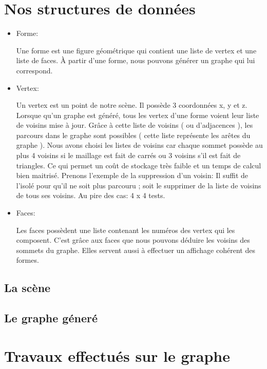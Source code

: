 \documentclass[a4paper,12pt]{report}
\begin{document}
\section{Nos structures de données}
\begin{itemize}
 \item Forme:

Une forme est une figure géométrique qui contient une liste de vertex
et une liste de faces.
À partir d'une forme, nous pouvons générer un graphe qui lui correspond.
 
 \item Vertex:

Un vertex est un point de notre scène.
Il possède 3 coordonnées x, y et z.
Lorsque qu'un graphe est généré, tous les vertex d'une forme voient leur
liste de voisins mise à jour. Grâce à cette liste de voisins ( ou 
d'adjacences ), les parcours dans le graphe sont possibles ( cette liste
représente les arêtes du graphe ).
Nous avons choisi les listes de voisins car chaque sommet possède au plus
4 voisins si le maillage est fait de carrés ou 3 voisins s'il est fait de
triangles. Ce qui permet un coût de stockage très faible et un temps de
calcul bien maitrisé.
Prenons l'exemple de la suppression d'un voisin:
Il suffit de l'isolé pour qu'il ne soit plus parcouru ; soit le
supprimer de la liste de voisins de tous ses voisins.
Au pire des cas: 4 x 4 tests.
 
 \item Faces:

Les faces possèdent une liste contenant les numéros des vertex
qui les composent. C'est grâce aux faces que nous pouvons déduire les
voisins des sommets du graphe. Elles servent aussi à effectuer un affichage
cohérent des formes.
\end{itemize}




\subsection{La scène}

\subsection{Le graphe géneré}

\section{Travaux effectués sur le graphe}
\end{document}
